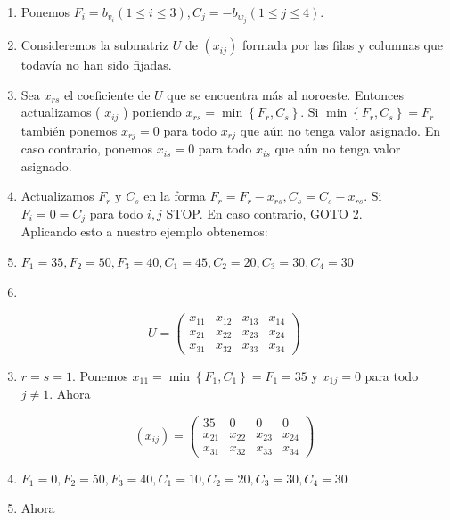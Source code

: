 \documentclass[10pt]{article}
\begin{document}
\begin{enumerate}
  \item Ponemos $F_{i}=b_{v_{i}}(1 \leq i \leq 3), C_{j}=-b_{w_{j}}(1 \leq j \leq 4)$.
  \item Consideremos la submatriz $U$ de $\left(x_{i j}\right)$ formada por las filas y columnas que todavía no han sido fijadas.
  \item Sea $x_{r s}$ el coeficiente de $U$ que se encuentra más al noroeste. Entonces actualizamos ( $x_{i j}$ ) poniendo $x_{r s}=\min \left\{F_{r}, C_{s}\right\}$. Si $\min \left\{F_{r}, C_{s}\right\}=F_{r}$ también ponemos $x_{r j}=0$ para todo $x_{r j}$ que aún no tenga valor asignado. En caso contrario, ponemos $x_{i s}=0$ para todo $x_{i s}$ que aún no tenga valor asignado.
  \item Actualizamos $F_{r}$ y $C_{s}$ en la forma $F_{r}=F_{r}-x_{r s}, C_{s}=C_{s}-x_{r s}$. Si $F_{i}=0=C_{j}$ para todo $i, j$ STOP. En caso contrario, GOTO 2.\\
Aplicando esto a nuestro ejemplo obtenemos:
  \item $F_{1}=35, F_{2}=50, F_{3}=40, C_{1}=45, C_{2}=20, C_{3}=30, C_{4}=30$
  \item 
\end{enumerate}

$$
U=\left(\begin{array}{llll}
x_{11} & x_{12} & x_{13} & x_{14} \\
x_{21} & x_{22} & x_{23} & x_{24} \\
x_{31} & x_{32} & x_{33} & x_{34}
\end{array}\right)
$$

\begin{enumerate}
  \setcounter{enumi}{2}
  \item $r=s=1$. Ponemos $x_{11}=\min \left\{F_{1}, C_{1}\right\}=F_{1}=35$ y $x_{1 j}=0$ para todo $j \neq 1$. Ahora
\end{enumerate}

$$
\left(x_{i j}\right)=\left(\begin{array}{cccc}
35 & 0 & 0 & 0 \\
x_{21} & x_{22} & x_{23} & x_{24} \\
x_{31} & x_{32} & x_{33} & x_{34}
\end{array}\right)
$$

\begin{enumerate}
  \setcounter{enumi}{3}
  \item $F_{1}=0, F_{2}=50, F_{3}=40, C_{1}=10, C_{2}=20, C_{3}=30, C_{4}=30$
  \item Ahora
\end{enumerate}
\end{document}
